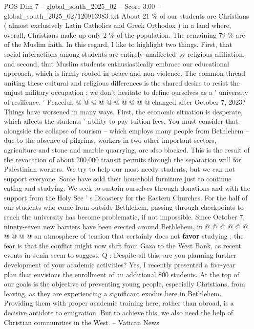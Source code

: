 \begin{textsample}{POS Dim 7 – global\_south\_2025\_02 – Score 3.00 – global\_south\_2025\_02/120913983.txt}
About 21 \% of our students are Christians ( almost exclusively Latin Catholics and Greek Orthodox ) in a land where, overall, Christians make up only 2 \% of the population.
The remaining 79 \% are of the Muslim faith.
In this regard, I like to highlight two things.
First, that social interactions among students are entirely unaffected by religious affiliation, and second, that Muslim students enthusiastically embrace our educational approach, which is firmly rooted in peace and non-violence.
The common thread uniting these cultural and religious differences is the shared desire to resist the unjust military occupation ; we don't hesitate to define ourselves as a ' university of resilience. ' Peaceful, @ @ @ @ @ @ @ @ @ @ changed after October 7, 2023?
Things have worsened in many ways.
First, the economic situation is desperate, which affects the students ' ability to pay tuition fees.
You must consider that, alongside the collapse of tourism -- which employs many people from Bethlehem -- due to the absence of pilgrims, workers in two other important sectors, agriculture and stone and marble quarrying, are also blocked.
This is the result of the revocation of about 200,000 transit permits through the separation wall for Palestinian workers.
We try to help our most needy students, but we can not support everyone.
Some have sold their household furniture just to continue eating and studying.
We seek to sustain ourselves through donations and with the support from the Holy See ' s Dicastery for the Eastern Churches.
For the half of our students who come from outside Bethlehem, passing through checkpoints to reach the university has become problematic, if not impossible.
Since October 7, ninety-seven new barriers have been erected around Bethlehem, in @ @ @ @ @ @ @ @ @ @ an atmosphere of tension that certainly does not \textbf{favor} studying ; the fear is that the conflict might now shift from Gaza to the West Bank, as recent events in Jenin seem to suggest.
Q : Despite all this, are you planning further development of your academic activities?
Yes, I recently presented a five-year plan that envisions the enrollment of an additional 800 students.
At the top of our goals is the objective of preventing young people, especially Christians, from leaving, as they are experiencing a significant exodus here in Bethlehem.
Providing them with proper academic training here, rather than abroad, is a decisive antidote to emigration.
But to achieve this, we also need the help of Christian communities in the West. -- Vatican News

\end{textsample}
